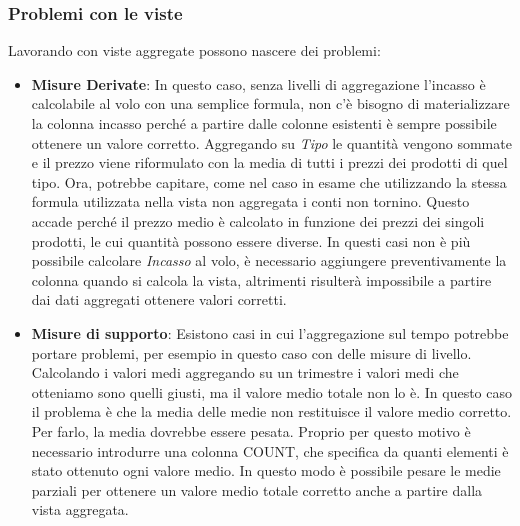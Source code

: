 \subsubsection{Problemi con le viste}
Lavorando con viste aggregate possono nascere dei problemi:
\begin{itemize}
	\item \textbf{Misure Derivate}:
	In questo caso, senza livelli di aggregazione l'incasso è calcolabile al volo con una semplice formula, non c'è bisogno di materializzare la colonna incasso perché a partire dalle colonne esistenti è sempre possibile ottenere un valore corretto.\newline
	Aggregando su \textit{Tipo} le quantità vengono sommate e il prezzo viene riformulato con la media di tutti i prezzi dei prodotti di quel tipo. Ora, potrebbe capitare, come nel caso in esame che utilizzando la stessa formula utilizzata nella vista non aggregata i conti non tornino. Questo accade perché il prezzo medio è calcolato in funzione dei prezzi dei singoli prodotti, le cui quantità possono essere diverse.\newline
	In questi casi non è più possibile calcolare \textit{Incasso} al volo, è necessario aggiungere preventivamente la colonna quando si calcola la vista, altrimenti risulterà impossibile a partire dai dati aggregati ottenere valori corretti.
	\item \textbf{Misure di supporto}:
	Esistono casi in cui l'aggregazione sul tempo potrebbe portare problemi, per esempio in questo caso con delle misure di livello. Calcolando i valori medi aggregando su un trimestre i valori medi che otteniamo sono quelli giusti, ma il valore medio totale non lo è. In questo caso il problema è che la media delle medie non restituisce il valore medio corretto. Per farlo, la media dovrebbe essere pesata. Proprio per questo motivo è necessario introdurre una colonna COUNT, che specifica da quanti elementi è stato ottenuto ogni valore medio. In questo modo è possibile pesare le medie parziali per ottenere un valore medio totale corretto anche a partire dalla vista aggregata.
\end{itemize}

